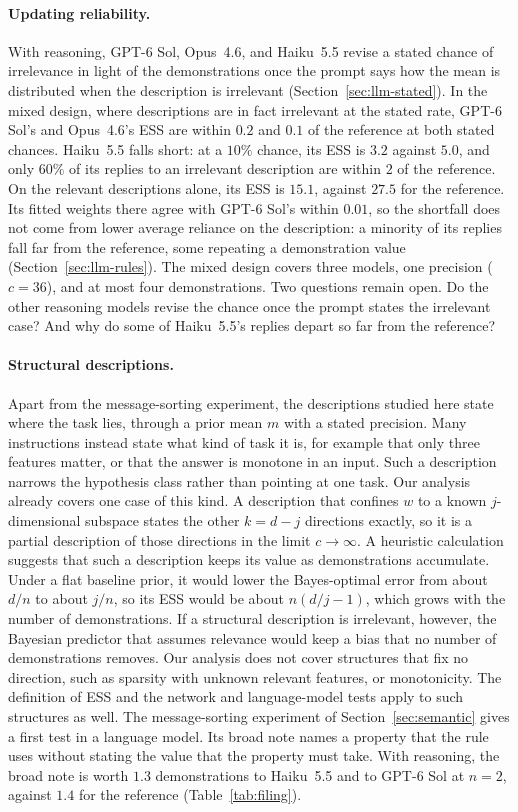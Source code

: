 \paragraph{Updating reliability.}
With reasoning, GPT-6 Sol, Opus~4.6, and Haiku~5.5 revise a stated chance of irrelevance in light of the demonstrations once the prompt says how the mean is distributed when the description is irrelevant (Section~\ref{sec:llm-stated}). In the mixed design, where descriptions are in fact irrelevant at the stated rate, GPT-6 Sol's and Opus~4.6's ESS are within $0.2$ and $0.1$ of the reference at both stated chances. Haiku~5.5 falls short: at a $10\%$ chance, its ESS is $3.2$ against $5.0$, and only $60\%$ of its replies to an irrelevant description are within $2$ of the reference. On the relevant descriptions alone, its ESS is $15.1$, against $27.5$ for the reference. Its fitted weights there agree with GPT-6 Sol's within $0.01$, so the shortfall does not come from lower average reliance on the description: a minority of its replies fall far from the reference, some repeating a demonstration value (Section~\ref{sec:llm-rules}). The mixed design covers three models, one precision ($c=36$), and at most four demonstrations. Two questions remain open. Do the other reasoning models revise the chance once the prompt states the irrelevant case? And why do some of Haiku~5.5's replies depart so far from the reference?

\paragraph{Structural descriptions.}
Apart from the message-sorting experiment, the descriptions studied here state where the task lies, through a prior mean $m$ with a stated precision. Many instructions instead state what kind of task it is, for example that only three features matter, or that the answer is monotone in an input. Such a description narrows the hypothesis class rather than pointing at one task. Our analysis already covers one case of this kind. A description that confines $w$ to a known $j$-dimensional subspace states the other $k=d-j$ directions exactly, so it is a partial description of those directions in the limit $c\to\infty$. A heuristic calculation suggests that such a description keeps its value as demonstrations accumulate. Under a flat baseline prior, it would lower the Bayes-optimal error from about $d/n$ to about $j/n$, so its ESS would be about $n(d/j-1)$, which grows with the number of demonstrations. If a structural description is irrelevant, however, the Bayesian predictor that assumes relevance would keep a bias that no number of demonstrations removes. Our analysis does not cover structures that fix no direction, such as sparsity with unknown relevant features, or monotonicity. The definition of ESS and the network and language-model tests apply to such structures as well. The message-sorting experiment of Section~\ref{sec:semantic} gives a first test in a language model. Its broad note names a property that the rule uses without stating the value that the property must take. With reasoning, the broad note is worth $1.3$ demonstrations to Haiku~5.5 and to GPT-6 Sol at $n = 2$, against $1.4$ for the reference (Table~\ref{tab:filing}).

